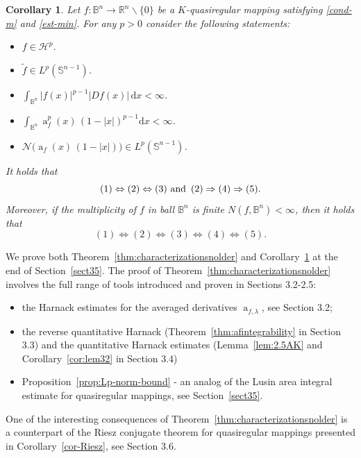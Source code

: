 \documentclass[11pt,a4paper,reqno]{amsart}
\newtheorem{cor}[theorem]{Corollary}
\theoremstyle{definition}
\renewcommand{\a}{\operatorname{a}}
\newcommand{\B}{\mathbb{B}^n}
\newcommand{\Nm}{\mathcal{N}}
\newcommand{\R}{\mathbb{R}}
\newcommand{\ud}{\mathrm {d}}
\newcommand{\Sn}{\mathbb{S}^{n-1}}
\numberwithin{komcounter}{section}
\begin{document}
\begin{cor}\label{cor-thm-nolder} Let $f:\B\rightarrow \R^n\backslash\{ 0\}$ be a $K$-quasiregular mapping satisfying \eqref{cond-m} and \eqref{est-min}.  For any $p>0$ consider the following statements:
\begin{itemize}
\item[(1)] $f\in \mathcal{H}^p$.
\item[(2)] $\tilde f\in L^p(\Sn)$.
\item[(3)] $\int_{\B}|f(x)|^{p-1} |Df(x)|\,\ud x <\infty$.
\item[(4)] $\int_{\B}\a_f^p(x)\, (1-|x|)^{p-1}\ud x<\infty$.
\item[(5)] $\Nm\big(\a_f (x)\, (1-|x|)\big) \in L^p(\Sn)$.
%
\end{itemize}
It holds that 
\[
(1) \Leftrightarrow (2) \Leftrightarrow (3)\,\,\hbox {and }\, (2) \Rightarrow (4) \Rightarrow (5).
\]
Moreover, if the multiplicity of $f$ in ball $\B$ is finite $N(f,\B)<\infty$, then it holds that
\[
(1) \Leftrightarrow (2) \Leftrightarrow (3) \Leftrightarrow (4) \Leftrightarrow (5).
\]
\end{cor}

We prove both Theorem~\ref{thm:characterizationsnolder} and Corollary~\ref{cor-thm-nolder} at the end of Section~\ref{sect35}. The proof of Theorem~\ref{thm:characterizationsnolder} involves the full range of tools introduced and proven in Sections 3.2-2.5:
\begin{itemize} 
\item the Harnack estimates for the averaged derivatives $\a_{f,\lambda}$, see Section 3.2;
\item the reverse quantitative Harnack (Theorem~\ref{thm:afintegrability} in Section 3.3) and the quantitative Harnack estimates (Lemma~\ref{lem:2.5AK} and Corollary~\ref{cor:lem32} in Section 3.4)
\item Proposition~\ref{prop:Lp-norm-bound} - an analog of the Lusin area integral estimate for quasiregular mappings, see Section~\ref{sect35}. 
\end{itemize}

One of the interesting consequences of Theorem~\ref{thm:characterizationsnolder} is a counterpart of the Riesz conjugate theorem for quasiregular mappings presented in Corollary~\ref{cor-Riesz}, see Section 3.6.
\end{document}
